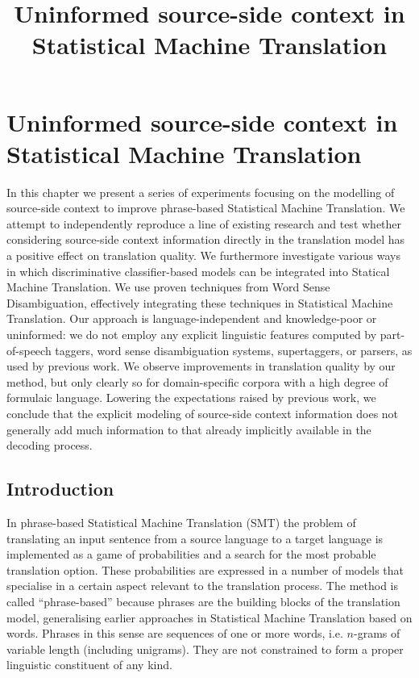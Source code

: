 \pgfplotsset{compat=newest}



\chapter{Uninformed source-side context in Statistical Machine Translation}
\title{Uninformed source-side context in Statistical Machine Translation}
\label{chap:contextinsmt}




In this chapter we present a series of experiments focusing on the modelling of
source-side context to improve phrase-based Statistical Machine Translation. We
attempt to independently reproduce a line of existing research and test whether
considering source-side context information directly in the translation model
has a positive effect on translation quality.  We furthermore investigate
various ways in which discriminative classifier-based models can be integrated
into Statical Machine Translation.  We use proven techniques from Word Sense
Disambiguation, effectively integrating these techniques in Statistical Machine
Translation. Our approach is language-independent and knowledge-poor or
uninformed: we do not employ any explicit linguistic features computed by
part-of-speech taggers, word sense disambiguation systems, supertaggers, or
parsers, as used by previous work. We observe improvements in translation
quality by our method, but only clearly so for domain-specific corpora with a
high degree of formulaic language. Lowering the expectations raised by previous
work, we conclude that the explicit modeling of source-side context information
does not generally add much information to that already implicitly available in
the decoding process.  


\section{Introduction}

In phrase-based Statistical Machine Translation (SMT) the problem of
translating an input sentence from a source language to a target language is
implemented as a game of probabilities and a search for the most probable
translation option.  These probabilities are expressed in a number of models
that specialise in a certain aspect relevant to the translation process. The
method is called ``phrase-based'' because phrases are the building blocks of
the translation model, generalising earlier approaches in
Statistical Machine Translation based on words.  Phrases in this
sense are sequences of one or more words, i.e. $n$-grams of variable
length (including unigrams). They are not constrained to form a
proper linguistic constituent of any kind.

